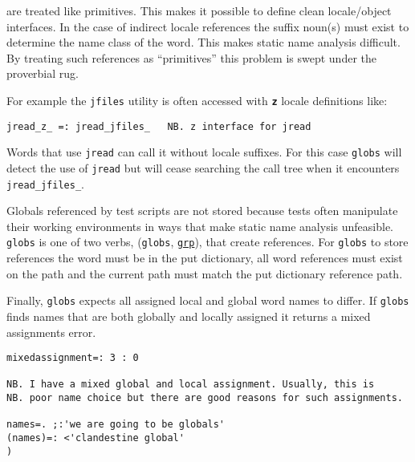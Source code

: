  
\noindent are treated like primitives. This makes it possible to define clean locale/object 
interfaces. In the case of indirect locale references the suffix noun(s) must exist 
to determine the name class of the word. This makes static name analysis difficult. 
By treating such references as ``primitives'' this problem is swept 
under the proverbial rug. 

For example the \texttt{jfiles} utility is often 
accessed with \textbf{\texttt{z}} locale definitions like: 

\begin{lstlisting}[frame=single,framerule=0pt] 
   jread_z_ =: jread_jfiles_   NB. z interface for jread
\end{lstlisting}

Words that use \texttt{jread} can call it without locale suffixes. 
For this case \texttt{globs} will detect the use of \texttt{jread} but will 
cease searching the call tree when it encounters \verb|jread_jfiles_|.

Globals referenced by test scripts are not stored because tests 
often manipulate their working environments in ways that make 
static name analysis unfeasible. \texttt{globs} is one of two verbs, 
(\texttt{globs}, \hyperlink{il:grp}{\texttt{grp}}), that create references. 
For \texttt{globs} to store 
references the word must be in the put dictionary, all 
word references must exist on the path and the current 
path must match the put dictionary reference path. 

Finally, \texttt{globs} expects all assigned local and global word names to differ. If \texttt{globs}
finds names that are both globally and locally assigned it returns a mixed assignments error.

\begin{lstlisting}[frame=single,framerule=0pt]
mixedassignment=: 3 : 0

NB. I have a mixed global and local assignment. Usually, this is 
NB. poor name choice but there are good reasons for such assignments.

names=. ;:'we are going to be globals'
(names)=: <'clandestine global'
)
\end{lstlisting}

